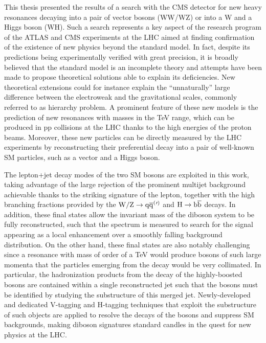 This thesis presented the results of a search with the CMS detector for new heavy resonances decaying into a pair of vector bosons (WW/WZ) or into a W and a Higgs boson (WH).
Such a search represents a key aspect of the research program of the ATLAS and CMS experiments at the LHC aimed at finding confirmation of the existence of new physics beyond the standard model.
In fact, despite its predictions being experimentally verified with great precision, it is broadly believed that the standard model is an incomplete theory and attempts have been made to propose theoretical solutions able to explain its deficiencies. New theoretical extensions could for instance explain the ``unnaturally'' large difference between the electroweak and the gravitational scales, commonly referred to as hierarchy problem. A prominent feature of these new models is the prediction of new resonances with masses in the TeV range, which can be produced in pp collisions at the LHC thanks to the high energies of the proton beams.
Moreover, these new particles can be directly measured by the LHC experiments by reconstructing their preferential decay into a pair of well-known SM particles, such as a vector and a Higgs boson.

The lepton+jet decay modes of the two SM bosons are exploited in this work, taking advantage of the large rejection of the prominent multijet background achievable thanks to the striking signature of the lepton, together with the high branching fractions provided by the $\mathrm{W}/\mathrm{Z}\to\mathrm{q}\overline{\mathrm{q}}^({}'^){}$ and $\mathrm{H}\to{\mathrm{b}\overline{\mathrm{b}}}$ decays. In addition, these final states allow the invariant mass of the diboson system to be fully reconstructed, such that the spectrum is measured to search for the signal appearing as a local enhancement over a smoothly falling background distribution. On the other hand, these final states are also notably challenging since a resonance with mass of order of a TeV would produce bosons of such large momenta that the particles emerging from the decay would be very collimated. In particular, the hadronization products from the decay of the highly-boosted bosons are contained within a single reconstructed jet such that the bosons must be identified by studying the substructure of this merged jet. Newly-developed and dedicated V-tagging and H-tagging techniques that exploit the substructure of such objects are applied to resolve the decays of the bosons and suppress SM backgrounds, making diboson signatures standard candles in the quest for new physics at the LHC.

